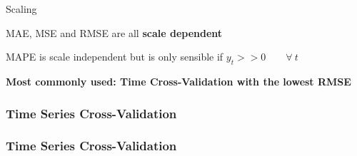 \documentclass{beamer}
\newenvironment{wideitemize}{\itemize\addtolength{\itemsep}{10pt}}{\enditemize}
\begin{document}
\begin{frame}{Scaling}  
  \begin{wideitemize}
  \item MAE, MSE and RMSE are all \textbf{scale dependent}
  \item MAPE is scale independent but is only sensible if $y_t >> 0 \qquad \forall \ t$
  \item \textbf{Most commonly used: Time Cross-Validation with the lowest RMSE}
  \end{wideitemize}  
\end{frame}


\begin{frame}
  \frametitle{Time Series Cross-Validation}
  \end{frame}

\begin{frame}
  \frametitle{Time Series Cross-Validation}
  \end{frame}
\end{document}
